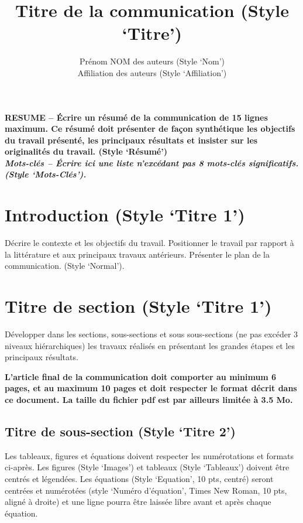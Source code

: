\documentclass[a4paper,10pt,twocolumn]{article}
\title{
\fontsize{24pt}{24pt}\selectfont
Titre de la communication (Style ‘Titre’)
}
\author{
\fontsize{11pt}{11pt}\selectfont
Prénom NOM des auteurs (Style ‘Nom’)\\
\fontsize{10pt}{10pt}\selectfont
Affiliation des auteurs (Style ‘Affiliation’)
}
\date{}
\begin{document}
\maketitle
\thispagestyle{fancy}


\fontsize{9pt}{9pt}\selectfont
\textbf{RESUME -- Écrire un résumé de la communication de 15 lignes maximum. Ce résumé doit présenter de façon synthétique les objectifs du travail présenté, les principaux résultats et insister sur les originalités du travail. (Style ‘Résumé’)}\\

\textbf{\textit{Mots-clés -- Écrire ici une liste n’excédant pas 8 mots-clés significatifs. (Style ‘Mots-Clés’).}}

\fontsize{10pt}{10pt}\selectfont


\section{Introduction  (Style ‘Titre 1’)}

Décrire le contexte et les objectifs du travail. Positionner le travail par rapport à la littérature et aux principaux travaux antérieurs. Présenter le plan de la communication. (Style ‘Normal’).

\section{Titre de section (Style ‘Titre 1’)}

Développer dans les sections, sous-sections et sous sous-sections (ne pas excéder 3 niveaux hiérarchiques) les travaux réalisés en présentant les grandes étapes et les principaux résultats.

\textbf{L’article final de la communication doit comporter au minimum 6 pages, et au maximum 10 pages et doit respecter le format décrit dans ce document. La taille du fichier pdf est par ailleurs limitée à 3.5 Mo.}

\subsection{Titre de sous-section (Style ‘Titre 2’)}

Les tableaux, figures et équations doivent respecter les numérotations et formats ci-après. Les figures (Style ‘Images’) et tableaux (Style ‘Tableaux’) doivent être centrés et légendées. Les équations (Style ‘Equation’, 10 pts, centré) seront centrées et numérotées (style ‘Numéro d’équation’, Times New Roman, 10 pts, aligné à droite) et une ligne pourra être laissée libre avant et après chaque équation.
\end{document}
